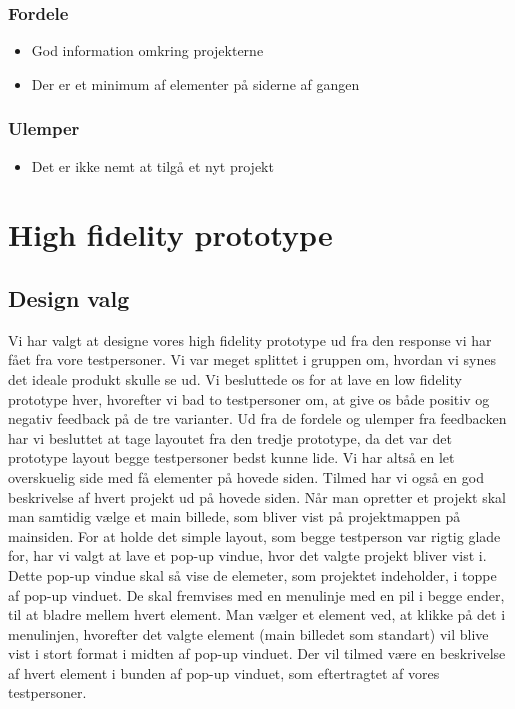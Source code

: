 \documentclass[a4paper,titlepage,fleqn,12pt]{article}
\begin{document}
\subsubsection{Fordele}
\begin{itemize}
	\item God information omkring projekterne
	\item Der er et minimum af elementer på siderne af gangen
\end{itemize}

\subsubsection{Ulemper}
\begin{itemize}
	\item Det er ikke nemt at tilgå et nyt projekt
\end{itemize}


\section{High fidelity prototype}

\subsection{Design valg}

Vi har valgt at designe vores high fidelity prototype ud fra den response vi har fået fra vore testpersoner. Vi var meget splittet i gruppen om, hvordan vi synes det ideale produkt skulle se ud. Vi besluttede os for at lave en low fidelity prototype hver, hvorefter vi bad to testpersoner om, at give os både positiv og negativ feedback på de tre varianter. Ud fra de fordele og ulemper fra feedbacken har vi besluttet at tage layoutet fra den tredje prototype, da det var det prototype layout begge testpersoner bedst kunne lide. Vi har altså en let overskuelig side med få elementer på hovede siden. Tilmed har vi også en god beskrivelse af hvert projekt ud på hovede siden. Når man opretter et projekt skal man samtidig vælge et main billede, som bliver vist på projektmappen på mainsiden. For at holde det simple layout, som begge testperson var rigtig glade for, har vi valgt at lave et pop-up vindue, hvor det valgte projekt bliver vist i. Dette pop-up vindue skal så vise de elemeter, som projektet indeholder, i toppe af pop-up vinduet. De skal fremvises med en menulinje med en pil i begge ender, til at bladre mellem hvert element. Man vælger et element ved, at klikke på det i menulinjen, hvorefter det valgte element (main billedet som standart) vil blive vist i stort format i midten af pop-up vinduet. Der vil tilmed være en beskrivelse af hvert element i bunden af pop-up vinduet, som eftertragtet af vores testpersoner.
\end{document}
